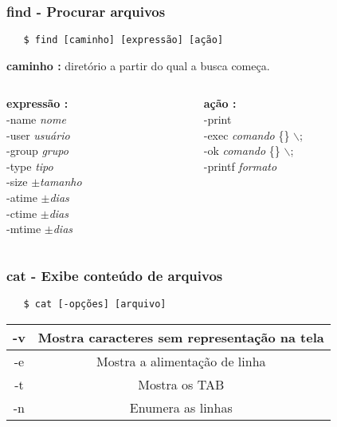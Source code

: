 \documentclass{beamer}
\begin{document}
\begin{frame}[fragile]
   \frametitle{find - Procurar arquivos}
   \begin{verbatim}
   $ find [caminho] [expressão] [ação]
   \end{verbatim}
   \textbf{caminho :} diretório a partir do qual a busca começa. \\
   \begin{columns}
   \begin{column}{0.5\textwidth}
   \textbf{expressão :} \\ 
      -name \textit{nome} \\
      -user \textit{usuário} \\
      -group \textit{grupo} \\
      -type \textit{tipo} \\
      -size $\pm$\textit{tamanho} \\
      -atime $\pm$\textit{dias} \\
      -ctime $\pm$\textit{dias} \\
      -mtime $\pm$\textit{dias} \\
   \end{column}
   \begin{column}{0.5\textwidth}
   \textbf{ação :} \\
      -print \\
      -exec \textit{comando} \{\} $\backslash$; \\
      -ok \textit{comando} \{\} $\backslash$; \\ 
      -printf \textit{formato}
   \end{column}
   \end{columns}
\end{frame}

\begin{frame}[fragile]
   \frametitle{cat - Exibe conteúdo de arquivos}
   \begin{verbatim}
   $ cat [-opções] [arquivo]
   \end{verbatim}
   \begin{table}
      \begin{tabular}{ c | c }
         -v & Mostra caracteres sem representação na tela \\
         \hline 
         -e & Mostra a alimentação de linha \\
         \hline
         -t & Mostra os TAB \\
         \hline
         -n & Enumera as linhas \\
      \end{tabular}
   \end{table}
\end{frame}
\end{document}
